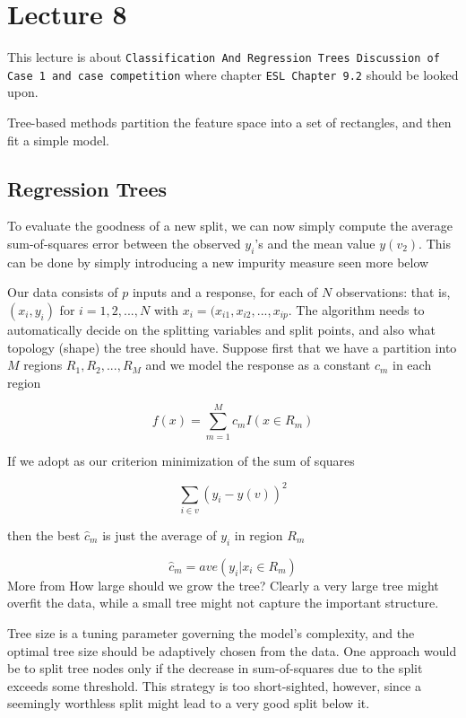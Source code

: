 \chapter{Lecture 8}

This lecture is about \texttt{Classification And Regression Trees
Discussion of Case 1 and case competition} where chapter \texttt{ESL Chapter 9.2} should be looked upon.


Tree-based methods partition the feature space into a set of rectangles, and then fit a simple model.



\section{Regression Trees}

To evaluate the goodness of a new split, we can now simply compute the average sum-of-squares error between the observed $y_i$'s and the mean value $y(v_2)$. This can be done by simply introducing a new impurity measure seen more below


Our data consists of $p$ inputs and a response, for each of $N$ observations: that is, $(x_i, y_i)$ for $i=1, 2, ..., N$ with $x_i = (x_{i1}, x_{i2},...,x_{ip}$. The algorithm
needs to automatically decide on the splitting variables and split points, and also what topology (shape) the tree should have. Suppose first that we have a partition into $M$ regions $R_1, R_2, ..., R_M$ and we model the response as a constant $c_m$ in each region

\[
    f(x) = \sum_{m=1}^{M} c_m I(x \in R_m)
\]

If we adopt as our criterion minimization of the sum of squares

\[
     \sum_{i \in v} (y_i - y(v))^2
\]

then the best $\hat{c}_m$ is just the average of $y_i$ in region $R_m$

\[
    \hat{c}_m = ave(y_i | x_i \in R_m)
\]
More from \cite[p.~307]{friedman2016elements}
How large should we grow the tree? Clearly a very large tree might overfit the data, while a small tree might not capture the important structure.

Tree size is a tuning parameter governing the model’s complexity, and the
optimal tree size should be adaptively chosen from the data. One approach
would be to split tree nodes only if the decrease in sum-of-squares due to the
split exceeds some threshold. This strategy is too short-sighted, however,
since a seemingly worthless split might lead to a very good split below it.


